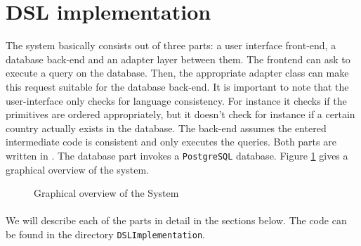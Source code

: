 \section{DSL implementation}
The system basically consists out of three parts: a user interface front-end, 
a database back-end and an adapter layer between them. The frontend can ask to 
execute a query on the database. Then, the appropriate adapter class can make this 
request suitable for the database back-end. It is important to note that
the user-interface only checks for language consistency. For instance it checks
if the primitives are ordered appropriately, but it doesn't check for instance if
a certain country actually exists in the database. The back-end assumes the
entered intermediate code is consistent and only executes the queries. Both
parts are written in \Csh{}. The database part invokes a \texttt{PostgreSQL}
database. Figure \ref{fig:systemOverview} gives a graphical overview of the system.
\begin{figure}[hbt]
\centering
{}
\caption{Graphical overview of the System}
\label{fig:systemOverview}
\end{figure}
\paragraph{}We will describe each of the parts in detail in the sections below. The code can be found in the directory \texttt{DSLImplementation}.